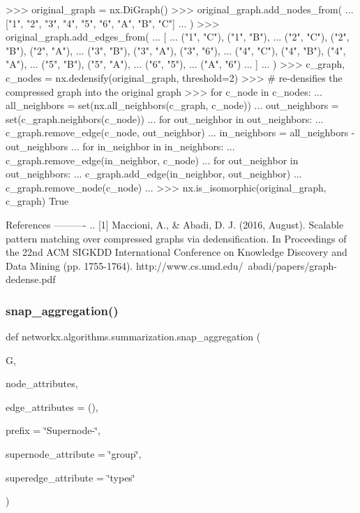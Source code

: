 \begin{DoxyVerb}
    >>> original_graph = nx.DiGraph()
    >>> original_graph.add_nodes_from(
    ...     ["1", "2", "3", "4", "5", "6", "A", "B", "C"]
    ... )
    >>> original_graph.add_edges_from(
    ...     [
    ...         ("1", "C"), ("1", "B"),
    ...         ("2", "C"), ("2", "B"), ("2", "A"),
    ...         ("3", "B"), ("3", "A"), ("3", "6"),
    ...         ("4", "C"), ("4", "B"), ("4", "A"),
    ...         ("5", "B"), ("5", "A"),
    ...         ("6", "5"),
    ...         ("A", "6")
    ...     ]
    ... )
    >>> c_graph, c_nodes = nx.dedensify(original_graph, threshold=2)
    >>> # re-densifies the compressed graph into the original graph
    >>> for c_node in c_nodes:
    ...     all_neighbors = set(nx.all_neighbors(c_graph, c_node))
    ...     out_neighbors = set(c_graph.neighbors(c_node))
    ...     for out_neighbor in out_neighbors:
    ...         c_graph.remove_edge(c_node, out_neighbor)
    ...     in_neighbors = all_neighbors - out_neighbors
    ...     for in_neighbor in in_neighbors:
    ...         c_graph.remove_edge(in_neighbor, c_node)
    ...         for out_neighbor in out_neighbors:
    ...             c_graph.add_edge(in_neighbor, out_neighbor)
    ...     c_graph.remove_node(c_node)
    ...
    >>> nx.is_isomorphic(original_graph, c_graph)
    True

References
----------
.. [1] Maccioni, A., & Abadi, D. J. (2016, August).
   Scalable pattern matching over compressed graphs via dedensification.
   In Proceedings of the 22nd ACM SIGKDD International Conference on
   Knowledge Discovery and Data Mining (pp. 1755-1764).
   http://www.cs.umd.edu/~abadi/papers/graph-dedense.pdf
\end{DoxyVerb}
 \mbox{\label{namespacenetworkx_1_1algorithms_1_1summarization_a0445ab90444d00989bb2e81c66a90370}} 
\subsubsection{\texorpdfstring{snap\+\_\+aggregation()}{snap\_aggregation()}}
{\footnotesize\ttfamily def networkx.\+algorithms.\+summarization.\+snap\+\_\+aggregation (\begin{DoxyParamCaption}\item[{}]{G,  }\item[{}]{node\+\_\+attributes,  }\item[{}]{edge\+\_\+attributes = {\ttfamily ()},  }\item[{}]{prefix = {\ttfamily \char`\"{}Supernode-\/\char`\"{}},  }\item[{}]{supernode\+\_\+attribute = {\ttfamily \char`\"{}group\char`\"{}},  }\item[{}]{superedge\+\_\+attribute = {\ttfamily \char`\"{}types\char`\"{}} }\end{DoxyParamCaption})}

